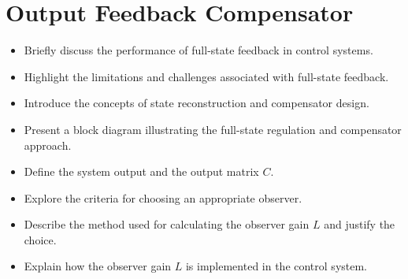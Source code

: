 \section{Output Feedback Compensator}

\begin{itemize}
    \item Briefly discuss the performance of full-state feedback in control systems.
    \item Highlight the limitations and challenges associated with full-state feedback.
    \item Introduce the concepts of state reconstruction and compensator design.
    \item Present a block diagram illustrating the full-state regulation and compensator approach.
    \item Define the system output and the output matrix \( C \).
    \item Explore the criteria for choosing an appropriate observer.
    \item Describe the method used for calculating the observer gain \( L \) and justify the choice.
    \item Explain how the observer gain \( L \) is implemented in the control system.
\end{itemize}
